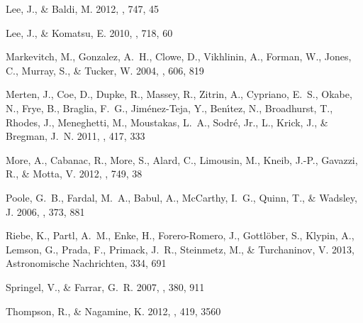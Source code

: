 \documentclass{emulateapj}
\begin{document}
\begin{thebibliography}{24}
{Lee}, J., \& {Baldi}, M. 2012, \apj, 747, 45

{Lee}, J., \& {Komatsu}, E. 2010, \apj, 718, 60

{Markevitch}, M., {Gonzalez}, A.~H., {Clowe}, D., {Vikhlinin}, A., {Forman},
  W., {Jones}, C., {Murray}, S., \& {Tucker}, W. 2004, \apj, 606, 819

{Merten}, J., {Coe}, D., {Dupke}, R., {Massey}, R., {Zitrin}, A., {Cypriano},
  E.~S., {Okabe}, N., {Frye}, B., {Braglia}, F.~G., {Jim{\'e}nez-Teja}, Y.,
  {Ben{\'{\i}}tez}, N., {Broadhurst}, T., {Rhodes}, J., {Meneghetti}, M.,
  {Moustakas}, L.~A., {Sodr{\'e}}, Jr., L., {Krick}, J., \& {Bregman}, J.~N.
  2011, \mnras, 417, 333

{More}, A., {Cabanac}, R., {More}, S., {Alard}, C., {Limousin}, M., {Kneib},
  J.-P., {Gavazzi}, R., \& {Motta}, V. 2012, \apj, 749, 38

{Poole}, G.~B., {Fardal}, M.~A., {Babul}, A., {McCarthy}, I.~G., {Quinn}, T.,
  \& {Wadsley}, J. 2006, \mnras, 373, 881

{Riebe}, K., {Partl}, A.~M., {Enke}, H., {Forero-Romero}, J., {Gottl{\"o}ber},
  S., {Klypin}, A., {Lemson}, G., {Prada}, F., {Primack}, J.~R., {Steinmetz},
  M., \& {Turchaninov}, V. 2013, Astronomische Nachrichten, 334, 691

{Springel}, V., \& {Farrar}, G.~R. 2007, \mnras, 380, 911

{Thompson}, R., \& {Nagamine}, K. 2012, \mnras, 419, 3560

\end{thebibliography}
\end{document}

